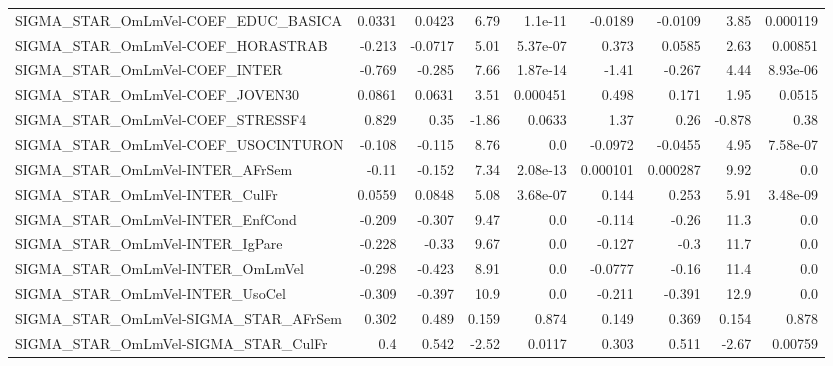 \begin{tabular}{lrrrrrrrr}
SIGMA\_STAR\_OmLmVel-COEF\_EDUC\_BASICA   &      0.0331 &       0.0423 &    6.79 &  1.1e-11 &    -0.0189 &     -0.0109 &         3.85 &      0.000119 \\
SIGMA\_STAR\_OmLmVel-COEF\_HORASTRAB     &      -0.213 &      -0.0717 &    5.01 & 5.37e-07 &      0.373 &      0.0585 &         2.63 &       0.00851 \\
SIGMA\_STAR\_OmLmVel-COEF\_INTER         &      -0.769 &       -0.285 &    7.66 & 1.87e-14 &      -1.41 &      -0.267 &         4.44 &      8.93e-06 \\
SIGMA\_STAR\_OmLmVel-COEF\_JOVEN30       &      0.0861 &       0.0631 &    3.51 & 0.000451 &      0.498 &       0.171 &         1.95 &        0.0515 \\
SIGMA\_STAR\_OmLmVel-COEF\_STRESSF4      &       0.829 &         0.35 &   -1.86 &   0.0633 &       1.37 &        0.26 &       -0.878 &          0.38 \\
SIGMA\_STAR\_OmLmVel-COEF\_USOCINTURON   &      -0.108 &       -0.115 &    8.76 &      0.0 &    -0.0972 &     -0.0455 &         4.95 &      7.58e-07 \\
SIGMA\_STAR\_OmLmVel-INTER\_AFrSem       &       -0.11 &       -0.152 &    7.34 & 2.08e-13 &   0.000101 &    0.000287 &         9.92 &           0.0 \\
SIGMA\_STAR\_OmLmVel-INTER\_CulFr        &      0.0559 &       0.0848 &    5.08 & 3.68e-07 &      0.144 &       0.253 &         5.91 &      3.48e-09 \\
SIGMA\_STAR\_OmLmVel-INTER\_EnfCond      &      -0.209 &       -0.307 &    9.47 &      0.0 &     -0.114 &       -0.26 &         11.3 &           0.0 \\
SIGMA\_STAR\_OmLmVel-INTER\_IgPare       &      -0.228 &        -0.33 &    9.67 &      0.0 &     -0.127 &        -0.3 &         11.7 &           0.0 \\
SIGMA\_STAR\_OmLmVel-INTER\_OmLmVel      &      -0.298 &       -0.423 &    8.91 &      0.0 &    -0.0777 &       -0.16 &         11.4 &           0.0 \\
SIGMA\_STAR\_OmLmVel-INTER\_UsoCel       &      -0.309 &       -0.397 &    10.9 &      0.0 &     -0.211 &      -0.391 &         12.9 &           0.0 \\
SIGMA\_STAR\_OmLmVel-SIGMA\_STAR\_AFrSem  &       0.302 &        0.489 &   0.159 &    0.874 &      0.149 &       0.369 &        0.154 &         0.878 \\
SIGMA\_STAR\_OmLmVel-SIGMA\_STAR\_CulFr   &         0.4 &        0.542 &   -2.52 &   0.0117 &      0.303 &       0.511 &        -2.67 &       0.00759 \\

\end{tabular}
